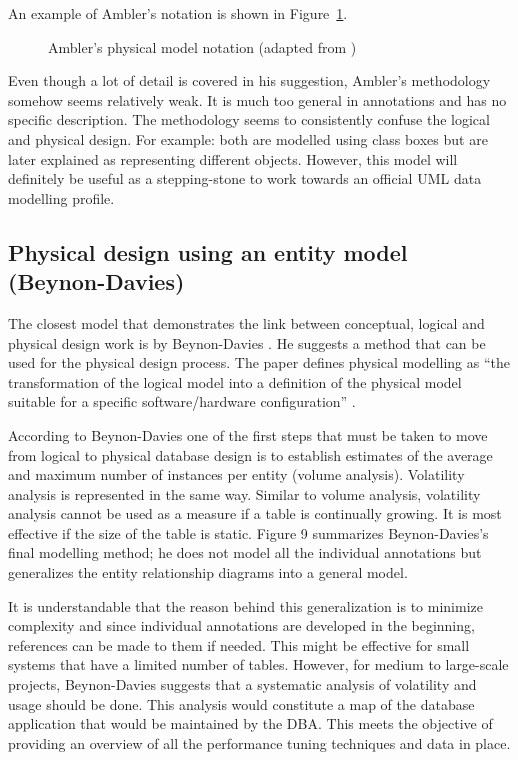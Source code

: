 \documentclass{llncs}
\begin{document}
An example of Ambler's notation is shown in Figure~\ref{fig-Ambler}.

\begin{figure}
	\caption{Ambler's physical model notation (adapted from \cite{Ambl-SW-2003-ADT})}
	\label{fig-Ambler}
\end{figure}

Even though a lot of detail is covered in his suggestion, Ambler's methodology somehow seems relatively weak. It is much too general in annotations and has no specific description. The methodology seems to consistently confuse the logical and physical design. For example: both are modelled using class boxes but are later explained as representing different objects. However, this model will definitely be useful as a stepping-stone to work towards an official UML data modelling profile.


\subsection{Physical design using an entity model (Beynon-Davies)}

The closest model that demonstrates the link between conceptual, logical and physical design work is by Beynon-Davies \cite{BeDa-P-1992-PDD}. He suggests a method that can be used for the physical design process. The paper defines physical modelling as ``the transformation of the logical model into a definition of the physical model suitable for a specific software/hardware configuration'' \cite{BeDa-P-1992-PDD}.

According to Beynon-Davies one of the first steps that must be taken to move from logical to physical database design is to establish estimates of the average and maximum number of instances per entity (volume analysis).
Volatility analysis is represented in the same way. Similar to volume analysis, volatility analysis cannot be used as a measure if a table is continually growing. It is most effective if the size of the table is static.
Figure 9 summarizes Beynon-Davies's final modelling method; he does not model all the individual annotations but generalizes the entity relationship diagrams into a general model. 

It is understandable that the reason behind this generalization is to minimize complexity and since individual annotations are developed in the beginning, references can be made to them if needed. This might be effective for small systems that have a limited number of tables. However, for medium to large-scale projects, Beynon-Davies suggests that a systematic analysis of volatility and usage should be done. This analysis would constitute a map of the database application that would be maintained by the DBA. This meets the objective of providing an overview of all the performance tuning techniques and data in place.
\end{document}
